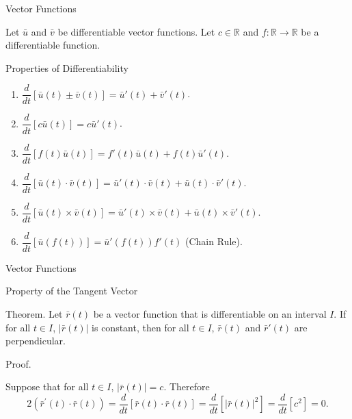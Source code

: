 \documentclass{beamer}
\begin{document}
    \begin{frame}[t]{Vector Functions}
        \par Let $\bar{u}$ and $\bar{v}$ be differentiable vector functions. Let $c \in \mathbb{R}$ and $f: \mathbb{R} \to \mathbb{R}$ be a differentiable function.
        \begin{block}{Properties of Differentiability}
            \begin{enumerate}
                \item $\dfrac{d}{dt} [\bar{u} (t) \pm \bar{v} (t)] = \bar{u}'(t) + \bar{v}'(t)$.
                \item $\dfrac{d}{dt} [c \bar{u}(t)] = c \bar{u}'(t)$.
                \item $\dfrac{d}{dt} [ f(t) \bar{u} (t)] = f'(t) \bar{u}(t) + f(t) \bar{u}'(t)$.
                \item $\dfrac{d}{dt} [\bar{u} (t) \cdot \bar{v} (t)] = \bar{u}'(t) \cdot \bar{v}(t) + \bar{u} (t) \cdot \bar{v}'(t)$.
                \item $\dfrac{d}{dt} [\bar{u} (t) \times \bar{v} (t)] = \bar{u}'(t) \times \bar{v}(t) + \bar{u} (t) \times \bar{v}'(t)$.
                \item $\dfrac{d}{dt} [\bar{u} (f(t))] = \bar{u}'(f(t)) f'(t)$ (Chain Rule).
            \end{enumerate}
        \end{block}
    \end{frame}

    \begin{frame}[t]{Vector Functions}
        \begin{block}{Property of the Tangent Vector}
            \par \textcolor{yy}{Theorem.} Let $\bar{r} (t)$ be a vector function that is differentiable on an interval $I$. If for all $t \in I$, $|\bar{r} (t) |$ is constant, then for all $t \in I$, $\bar{r}(t)$ and $\bar{r}'(t)$ are perpendicular. 
        \end{block}

        \phantom{zjy}

        \par \textcolor{yy}{Proof.} 
        \par Suppose that for all $t \in I$, $|\bar{r} (t)| = c$. Therefore 
        \begin{equation*}
            2\left(\bar{r}^{\prime}(t) \cdot \bar{r}(t)\right)=\frac{d}{d t}[\bar{r}(t) \cdot \bar{r}(t)]=\frac{d}{d t}\left[|\bar{r}(t)|^{2}\right]=\frac{d}{d t}\left[c^{2}\right]=0 .
        \end{equation*}
    \end{frame}
\end{document}
